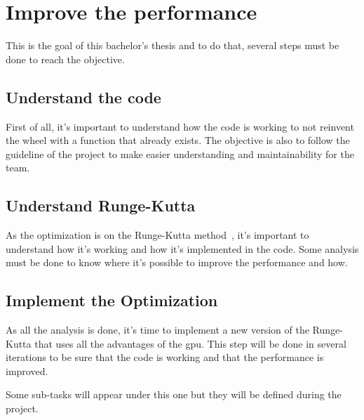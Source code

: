 \section{Improve the performance}
\label{spec:ch:activities:improve-the-performance}

This is the goal of this bachelor's thesis and to do that, several steps must be done to reach the objective.


\subsection{Understand the code}
\label{spec:ch:activities:improve-the-performance:understand-the-code}

First of all, it's important to understand how the code is working to not reinvent the wheel with a function that already exists.
The objective is also to follow the guideline of the project to make easier understanding and maintainability for the team.


\subsection{Understand Runge-Kutta}
\label{spec:ch:activities:improve-the-performance:understand-runge-kutta}

As the optimization is on the Runge-Kutta method~\cite{Runge-Kutta-methods}, it's important to understand how it's working and how it's implemented in the code.
Some analysis must be done to know where it's possible to improve the performance and how.


\subsection{Implement the Optimization}
\label{spec:ch:activities:improve-the-performance:implement-the-optimization}

As all the analysis is done, it's time to implement a new version of the Runge-Kutta that uses all the advantages of the \acrshort{gpu}.
This step will be done in several iterations to be sure that the code is working and that the performance is improved.

Some sub-tasks will appear under this one but they will be defined during the project.

